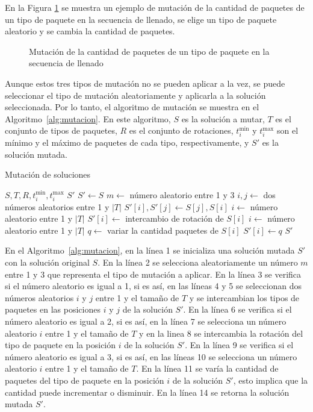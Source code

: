 En la Figura \ref{fig:mutacion_cantidad} se muestra un ejemplo de mutación de la cantidad de paquetes de un tipo de paquete en la secuencia de llenado, se elige un tipo de paquete aleatorio y se cambia la cantidad de paquetes.

\begin{figure}[H]
    \centering
    
    \caption{Mutación de la cantidad de paquetes de un tipo de paquete en la secuencia de llenado}
    \label{fig:mutacion_cantidad}
\end{figure}

Aunque estos tres tipos de mutación no se pueden aplicar a la vez, se puede seleccionar el tipo de mutación aleatoriamente y aplicarla a la solución seleccionada. Por lo tanto, el algoritmo de mutación se muestra en el Algoritmo~\ref{alg:mutacion}. En este algoritmo, $S$ es la solución a mutar, $T$ es el conjunto de tipos de paquetes, $R$ es el conjunto de rotaciones, $t_i^{\min}$ y $t_i^{\max}$ son el mínimo y el máximo de paquetes de cada tipo, respectivamente, y $S'$ es la solución mutada.

\begin{algorithm}[H]
    \caption{Mutación de soluciones}\label{alg:mutacion}
    \begin{algorithmic}[1]
        \Require $S, T, R, t_i^{\min}, t_i^{\max}$
        \Ensure $S'$
        \State $S' \leftarrow S$
        \State $m \leftarrow$ número aleatorio entre 1 y 3
        \State $i, j \leftarrow$ dos números aleatorios entre 1 y $|T|$
        \State $S'[i], S'[j] \leftarrow S[j], S[i]$
        \State $i \leftarrow$ número aleatorio entre 1 y $|T|$
        \State $S'[i] \leftarrow$ intercambio de rotación de $S[i]$
        \State $i \leftarrow$ número aleatorio entre 1 y $|T|$
        \State $q \leftarrow$ variar la cantidad paquetes de $S[i]$
        \State $S'[i] \leftarrow q$
        \EndIf
        \State \Return $S'$
    \end{algorithmic}
\end{algorithm}

En el Algoritmo~\ref{alg:mutacion}, en la línea 1 se inicializa una solución mutada $S'$ con la solución original $S$. En la línea 2 se selecciona aleatoriamente un número $m$ entre 1 y 3 que representa el tipo de mutación a aplicar. En la línea 3 se verifica si el número aleatorio es igual a 1, si es así, en las líneas 4 y 5 se seleccionan dos números aleatorios $i$ y $j$ entre 1 y el tamaño de $T$ y se intercambian los tipos de paquetes en las posiciones $i$ y $j$ de la solución $S'$. En la línea 6 se verifica si el número aleatorio es igual a 2, si es así, en la línea 7 se selecciona un número aleatorio $i$ entre 1 y el tamaño de $T$ y en la linea 8 se intercambia la rotación del tipo de paquete en la posición $i$ de la solución $S'$. En la línea 9 se verifica si el número aleatorio es igual a 3, si es así, en las líneas 10 se selecciona un número aleatorio $i$ entre 1 y el tamaño de $T$. En la línea 11 se varía la cantidad de paquetes del tipo de paquete en la posición $i$ de la solución $S'$, esto implica que la cantidad puede incrementar o disminuir. En la línea 14 se retorna la solución mutada $S'$.

